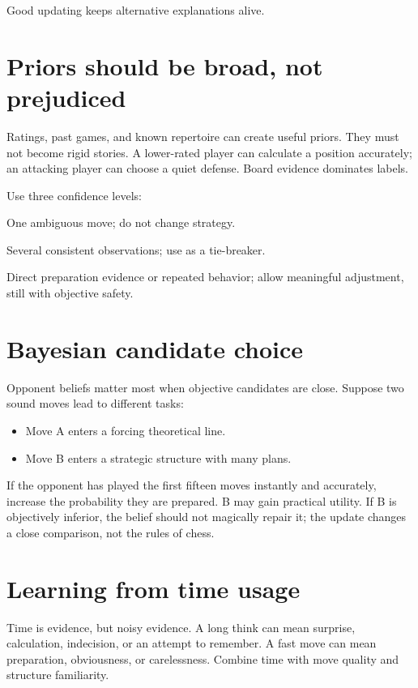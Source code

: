 Good updating keeps alternative explanations alive.

\section{Priors should be broad, not prejudiced}
Ratings, past games, and known repertoire can create useful priors. They must not become rigid stories. A lower-rated player can calculate a position accurately; an attacking player can choose a quiet defense. Board evidence dominates labels.

Use three confidence levels:

\begin{description}[style=nextline,leftmargin=2.4em,labelsep=.5em]
\item[Low confidence.] One ambiguous move; do not change strategy.
\item[Medium confidence.] Several consistent observations; use as a tie-breaker.
\item[High confidence.] Direct preparation evidence or repeated behavior; allow meaningful adjustment, still with objective safety.
\end{description}

\section{Bayesian candidate choice}
Opponent beliefs matter most when objective candidates are close. Suppose two sound moves lead to different tasks:

\begin{itemize}[leftmargin=1.4em]
\item Move A enters a forcing theoretical line.
\item Move B enters a strategic structure with many plans.
\end{itemize}

If the opponent has played the first fifteen moves instantly and accurately, increase the probability they are prepared. B may gain practical utility. If B is objectively inferior, the belief should not magically repair it; the update changes a close comparison, not the rules of chess.

\section{Learning from time usage}
Time is evidence, but noisy evidence. A long think can mean surprise, calculation, indecision, or an attempt to remember. A fast move can mean preparation, obviousness, or carelessness. Combine time with move quality and structure familiarity.

